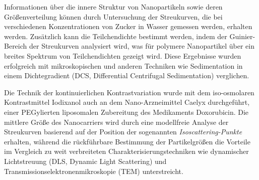 


Informationen über die innere Struktur von Nanopartikeln sowie deren Größenverteilung können durch Untersuchung der Streukurven, die bei verschiedenen Konzentrationen von Zucker in Wasser gemessen werden, erhalten werden. Zusätzlich kann die Teilchendichte bestimmt werden, indem der Guinier-Bereich der Streukurven analysiert wird, was für polymere Nanopartikel über ein breites Spektrum von Teilchendichten gezeigt wird. Diese Ergebnisse wurden erfolgreich mit mikroskopischen und anderen Techniken wie Sedimentation in einem Dichtegradient (DCS, Differential Centrifugal Sedimentation) verglichen.

Die Technik der kontinuierlichen Kontrastvariation wurde mit dem iso-osmolaren Kontrastmittel Iodixanol auch an dem Nano-Arzneimittel Caelyx durchgeführt, einer PEGylierten liposomalen Zubereitung des Medikaments Doxorubicin. Die mittlere Größe des Nanocarriers wird durch eine modellfreie Analyse der Streukurven basierend auf der Position der sogenannten \emph{Isoscattering-Punkte} erhalten, während die rückführbare Bestimmung der Partikelgrößen die Vorteile im Vergleich zu weit verbreiteten Charakterisierungstechniken wie dynamischer Lichtstreuung (DLS, Dynamic Light Scattering) und Transmissionselektronenmikroskopie (TEM) unterstreicht.


